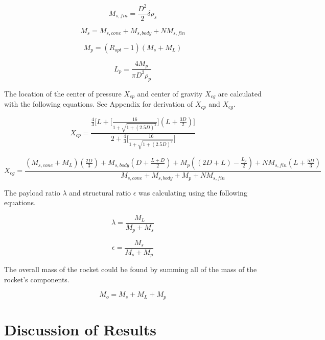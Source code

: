 \documentclass{report}
\begin{document}
\begin{equation}
    M_{s,fin} = \frac{D^2}{2}\delta\rho_s
\end{equation}

\begin{equation}
    M_s = M_{s,cone} + M_{s,body} + NM_{s,fin}
\end{equation}

\begin{equation}
    M_p = (R_{opt}-1)(M_s+M_L)
\end{equation}

\begin{equation}
    L_p = \frac{4M_p}{\pi D^2 \rho_p}
\end{equation}

\noindent The location of the center of pressure $X_{cp}$ and center of gravity $X_{cg}$ are calculated with the following equations. 
See Appendix for derivation of $X_{cp}$ and $X_{cg}$.

\begin{equation}
    X_{cp} = \frac{\frac{4}{3}\Biggl[L+\biggl[\frac{16}{1+\sqrt{1+(2.5D)^2}}\biggr](L+\frac{3D}{2})\Biggr]}{2+\frac{4}{3}\biggl[\frac{16}{1+\sqrt{1+(2.5D)^2}}\biggr]}
\end{equation}

\begin{equation}
    X_{cg} = \frac{(M_{s,cone}+M_L)(\frac{2D}{3})+M_{s,body}(D+\frac{L+D}{2})+M_p((2D+L)-\frac{L_p}{2})+NM_{s,fin}(L+\frac{5D}{3})}{M_{s,cone}+M_{s,body}+M_p+NM_{s,fin}}
\end{equation}

\noindent The payload ratio $\lambda$ and structural ratio $\epsilon$ was calculating using the following equations.

\begin{equation}
    \lambda = \frac{M_L}{M_p+M_s}
\end{equation}

\begin{equation}
    \epsilon = \frac{M_s}{M_s+M_p}
\end{equation}

\noindent The overall mass of the rocket could be found by summing all of the mass of the rocket's components.

\begin{equation}
    M_o = M_s + M_L + M_p
\end{equation}

\newpage
\section*{Discussion of Results}
\end{document}
